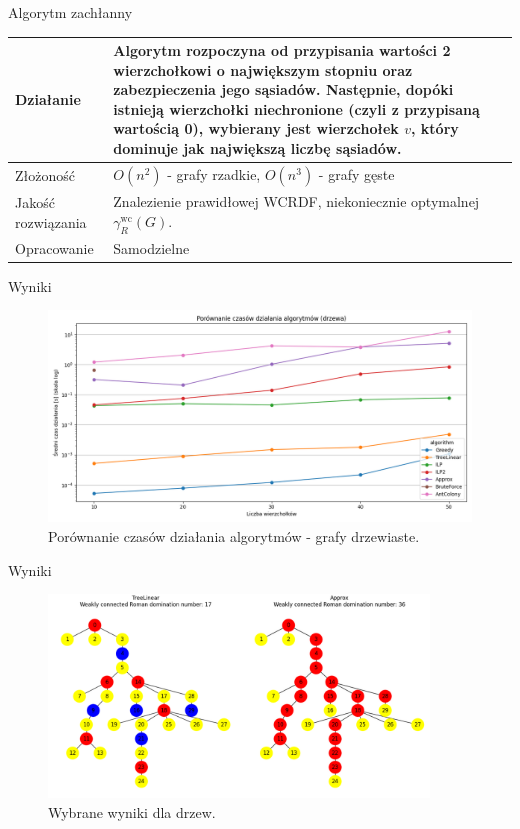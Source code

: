 \documentclass[polish,aspectratio=169]{beamer}
\begin{document}
\begin{frame}{Algorytm zachłanny}
    \begin{table}
        \centering
        \begin{tabular}{|p{4cm}|p{10cm}|}
        \hline
        Działanie & Algorytm rozpoczyna od przypisania wartości 2 wierzchołkowi o największym stopniu oraz zabezpieczenia jego sąsiadów. Następnie, dopóki istnieją wierzchołki niechronione (czyli z przypisaną wartością 0), wybierany jest wierzchołek $v$, który dominuje jak największą liczbę sąsiadów. \\
        \hline
        Złożoność & $O(n^2)$ - grafy rzadkie, $O(n^3)$ - grafy gęste  \\
        \hline
        Jakość rozwiązania & Znalezienie prawidłowej WCRDF, niekoniecznie optymalnej $\gamma^{\mathrm{wc}}_R(G)$.\\
        \hline
        Opracowanie & Samodzielne  \\
        \hline
        \end{tabular}
        \label{tab:zachlanny}
    \end{table}
\end{frame}

\begin{frame}{Wyniki}
    \begin{figure}
        \centering
        \includegraphics[width=1\textwidth]{images/trees.png}
        \caption{Porównanie czasów działania algorytmów - grafy drzewiaste.}
    \end{figure}    
\end{frame}

\begin{frame}{Wyniki}
    \begin{figure}
        \centering
        \includegraphics[width=0.9\textwidth]{images/image1.png}
        \caption{Wybrane wyniki dla drzew.}
    \end{figure}    
\end{frame}
\end{document}
